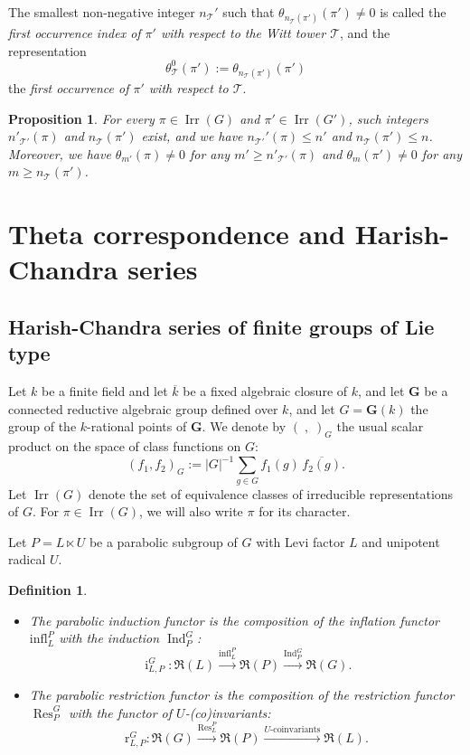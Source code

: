 \documentclass[12pt]{amsart}
\numberwithin{equation}{subsection}
\newtheorem{defn}[equation]{Definition}
\newtheorem{prop}[equation]{Proposition}
\newcommand{\cT}{\mathcal{T}}
\newcommand{\Ind}{\operatorname{Ind}}
\newcommand{\bG}{\mathbf{G}}
\newcommand{\Res}{\operatorname{Res}}
\newcommand{\rr}{\operatorname{r}}
\newcommand{\ii}{\operatorname{i}}
\newcommand{\fR}{\mathfrak{R}}
\newcommand{\Irr}{\operatorname{Irr}}
\def\infl{\mathrm{infl}}
\def\rr{{\mathrm{r}}}
\def\cT{{\mathcal{T}}}
\begin{document}
The smallest non-negative integer $n_{\cT}'$ such that $\theta_{n_{\cT}(\pi')}(\pi')\ne 0$ is called the \textit{first occurrence index of $\pi'$ with respect to the Witt tower $\cT$}, and the representation  
\[ \theta^0_{\cT}(\pi'):=\theta_{n_{\cT}(\pi')}(\pi')\]  the \textit{first occurrence of $\pi'$ with respect to $\cT$}. 

\begin{prop}
For every $\pi\in\Irr(G)$ and $\pi'\in\Irr(G')$, such integers $n'_{\cT'}(\pi)$ and $n_{\cT}(\pi')$ exist, and we have $n_{\cT'}'(\pi)\le n'$ and $n_{\cT}(\pi')\le n$. 
Moreover, we have $\theta_{m'}(\pi)\ne 0$ for any $m'\ge n'_{\cT'}(\pi)$ 
and $\theta_{m}(\pi')\ne 0$ for any $m\ge n_{\cT}(\pi')$.
\end{prop}

\section{Theta correspondence and Harish-Chandra series} \label{sec:thetaHC}

\subsection{Harish-Chandra series of finite groups of Lie type}
Let $k$ be  a finite field and let $\overline{k}$ be a fixed algebraic closure of $k$, and let $\bG$ be a connected reductive algebraic group defined over $k$, and let $G=\bG(k)$ the group of the $k$-rational points of $\bG$. We denote by $(\;,\;)_{G}$  the usual scalar product on the space of class functions on $G$: 
\begin{equation} \label{eqn:scalar product}
(f_1,f_2)_{G} := |G|^{-1}\sum_{g\in G}f_1(g)\,\overline{f_2(g)} .
\end{equation}
Let $\Irr(G)$ denote the set of equivalence classes of irreducible representations of $G$. For $\pi\in\Irr(G)$, we will also write $\pi$ for its character.

Let $P=L\ltimes U$ be a parabolic subgroup of $G$ with Levi factor $L$ and unipotent radical $U$.


\begin{defn} \
{\rm
\begin{itemize}
\item The \textit{parabolic induction functor} is the composition of the inflation functor $\infl_L^P$ with the induction $\Ind_P^G$:
\[\ii_{L,P}^G\colon\fR(L)\xrightarrow{\infl_L^P}\fR(P)\xrightarrow{\Ind_P^G}\fR(G).\]
\item The \textit{parabolic restriction functor} is the composition of the restriction functor $\Res_{P}^G$ with the functor of $U$-(co)invariants:
\[ \rr_{L,P}^G\colon\fR(G)\xrightarrow{\Res_L^P}\fR(P)\xrightarrow{\text{$U$-coinvariants}}\fR(L).\]
\end{itemize}
}
\end{defn}
\end{document}
